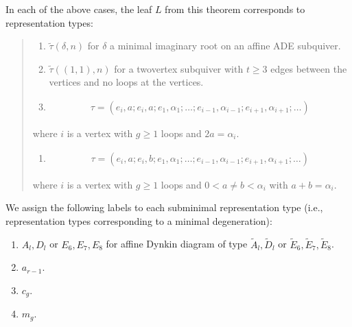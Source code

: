 \documentclass[letterpaper,10pt,english]{sphinxmanual}
\begin{document}
\sphinxAtStartPar
In each of the above cases, the leaf \(L\) from this theorem corresponds to representation types:
\begin{quote}
\begin{enumerate}
%
\item {} 
\sphinxAtStartPar
\(\tilde{\tau}(\delta,n)\) for \(\delta\) a minimal imaginary root on an affine ADE subquiver.

\item {} 
\sphinxAtStartPar
\(\tilde{\tau}((1,1),n)\) for a two\sphinxhyphen{}vertex subquiver with \(t\geq 3\) edges between the vertices and no loops at the vertices.

\item {} \begin{equation*}
\begin{split}\tau=(e_i,a;e_i,a;e_1,\alpha_1;\dots;e_{i-1},\alpha_{i-1};e_{i+1},\alpha_{i+1};\dots)\end{split}
\end{equation*}
\end{enumerate}

\sphinxAtStartPar
where \(i\) is a vertex with \(g\geq 1\) loops and \(2a=\alpha_i\).
\begin{enumerate}
%
\setcounter{enumi}{3}
\item {} \begin{equation*}
\begin{split}\tau=(e_i,a;e_i,b;e_1,\alpha_1;\dots;e_{i-1},\alpha_{i-1};e_{i+1},\alpha_{i+1};\dots)\end{split}
\end{equation*}
\end{enumerate}

\sphinxAtStartPar
where \(i\) is a vertex with \(g\geq 1\) loops and \(0<a\neq b<\alpha_i\) with \(a+b=\alpha_i\).
\end{quote}

\sphinxAtStartPar
We assign the following labels to each subminimal representation type (i.e., representation types corresponding to a minimal degeneration):
\begin{enumerate}
%
\item {} 
\sphinxAtStartPar
\(A_l,D_l\) or \(E_6,E_7,E_8\) for affine Dynkin diagram of type \(\tilde{A}_l,\tilde{D}_l\) or \(\tilde{E}_6,\tilde{E}_7,\tilde{E}_8\).

\item {} 
\sphinxAtStartPar
\(a_{r-1}\).

\item {} 
\sphinxAtStartPar
\(c_g\).

\item {} 
\sphinxAtStartPar
\(m_g\).

\end{enumerate}
\end{document}

